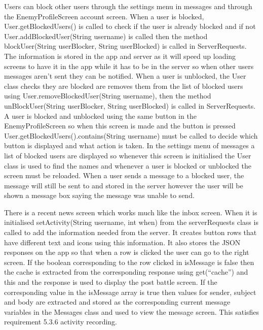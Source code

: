 Users can block other users through the settings menu in messages and through the EnemyProfileScreen account screen. When a user is blocked, User.getBlockedUsers() is called to check if the user is already blocked and if not User.addBlockedUser(String username) is called then the method blockUser(String userBlocker, String userBlocked) is called in ServerRequests. The information is stored in the app and server as it will speed up loading screens to have it in the app while it has to be in the server so when other users messages aren't sent they can be notified. When a user is unblocked, the User class checks they are blocked are removes them from the list of blocked users using User.removeBlockedUser(String username), then the method unBlockUser(String userBlocker, String userBlocked) is called in ServerRequests. A user is blocked and unblocked using the same button in the EnemyProfileScreen so when this screen is made and the button is pressed User.getBlockedUsers().contains(String username) must be called to decide which button is displayed and what action is taken. In the settings menu of messages a list of blocked users are displayed so whenever this screen is initialised the User class is used to find the names and whenever a user is blocked or unblocked the screen must be reloaded. When a user sends a message to a blocked user, the message will still be sent to and stored in the server however the user will be shown a message box saying the message was unable to send.

There is a recent news screen which works much like the inbox screen. When it is initialised setActivity(String username, int when) from the serverRequests class is called to add the information needed from the server. It creates button rows that have different text and icons using this information. It also stores the JSON responses on the app so that when a row is clicked the user can go to the right screen. If the boolean corresponding to the row clicked in isMessage is false then the cache is extracted from the corresponding response using get(``cache'') and this and the response is used to display the post battle screen. If the corresponding value in the isMessage array is true then values for sender, subject and body are extracted and stored as the corresponding current message variables in the Messages class and used to view the message screen. This satisfies requirement 5.3.6 activity recording.

